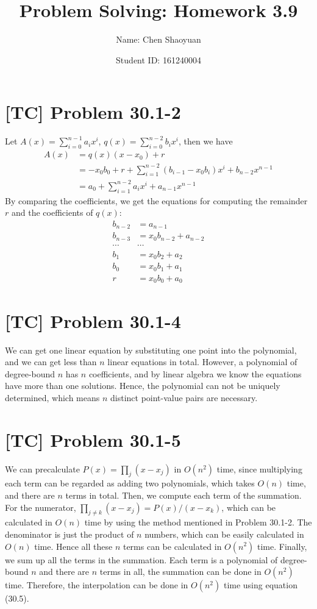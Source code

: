 \documentclass[a4paper,11pt,twocolumn]{article}
\newcommand{\homeworkno}{3.9}
\begin{document}
  \title{Problem Solving: Homework \homeworkno}
  \author{Name: Chen Shaoyuan \and Student ID: 161240004}
  \maketitle

  \section{[TC] Problem 30.1-2}
  Let $A(x) = \sum_{i=0}^{n-1} a_ix^i$, $q(x) = \sum_{i=0}^{n-2} b_ix^i$, then we have
  \begin{align*}
    A(x) &= q(x)(x - x_0) + r \\
         &= -x_0b_{0} + r + \sum_{i = 1}^{n-2}(b_{i-1}-x_0b_{i})x^i + b_{n-2}x^{n-1} \\
         &= a_0 + \sum_{i = 1}^{n-2}a_ix^i + a_{n-1}x^{n-1}
  \end{align*}
  By comparing the coefficients, we get the equations for computing the remainder $r$ and the coefficients of $q(x)$:
  \begin{align*}
    b_{n-2} &= a_{n-1} \\
    b_{n-3} &= x_0b_{n-2} + a_{n-2} \\
    \cdots & \cdots \\
    b_{1} &= x_0b_2 + a_2 \\
    b_{0} &= x_0b_1 + a_1 \\
    r &= x_0b_0 + a_0
  \end{align*}

  \section{[TC] Problem 30.1-4}
  We can get one linear equation by substituting one point into the polynomial, and we can get less than $n$ linear equations in total. However, a polynomial of degree-bound $n$ has $n$ coefficients, and by linear algebra we know the equations have more than one solutions. Hence, the polynomial can not be uniquely determined, which means $n$ distinct point-value pairs are necessary.

  \section{[TC] Problem 30.1-5}
  We can precalculate $P(x) = \prod_j (x-x_j)$ in $O(n^2)$ time, since multiplying each term can be regarded as adding two polynomials, which takes $O(n)$ time, and there are $n$ terms in total. Then, we compute each term of the summation. For the numerator, $\prod_{j \neq k} (x - x_j) = P(x) / (x - x_k)$, which can be calculated in $O(n)$ time by using the method mentioned in Problem 30.1-2. The denominator is just the product of $n$ numbers, which can be easily calculated in $O(n)$ time. Hence all these $n$ terms can be calculated in $O(n^2)$ time. Finally, we sum up all the terms in the summation. Each term is a polynomial of degree-bound $n$ and there are $n$ terms in all, the summation can be done in $O(n^2)$ time. Therefore, the interpolation can be done in $O(n^2)$ time using equation (30.5).
\end{document}
